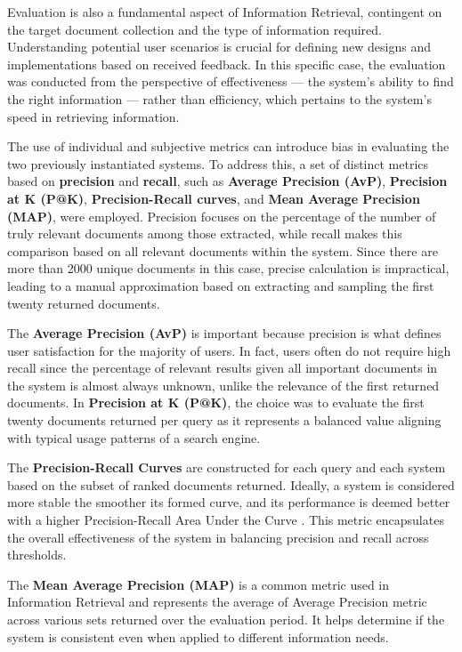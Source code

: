 \documentclass[sigconf]{acmart}
\begin{document}
Evaluation is also a fundamental aspect of Information Retrieval, contingent on the target document collection and the type of information required. Understanding potential user scenarios is crucial for defining new designs and implementations based on received feedback. In this specific case, the evaluation was conducted from the perspective of effectiveness — the system's ability to find the right information — rather than efficiency, which pertains to the system's speed in retrieving information.

The use of individual and subjective metrics can introduce bias in evaluating the two previously instantiated systems. To address this, a set of distinct metrics based on \textbf{precision} and \textbf{recall}, such as \textbf{Average Precision (AvP)}, \textbf{Precision at K (P@K)}, \textbf{Precision-Recall curves}, and \textbf{Mean Average Precision (MAP)}, were employed. Precision focuses on the percentage of the number of truly relevant documents among those extracted, while recall makes this comparison based on all relevant documents within the system. Since there are more than 2000 unique documents in this case, precise calculation is impractical, leading to a manual approximation based on extracting and sampling the first twenty returned documents.

The \textbf{Average Precision (AvP)} is important because precision is what defines user satisfaction for the majority of users. In fact, users often do not require high recall since the percentage of relevant results given all important documents in the system is almost always unknown, unlike the relevance of the first returned documents. In \textbf{Precision at K (P@K)}, the choice was to evaluate the first twenty documents returned per query as it represents a balanced value aligning with typical usage patterns of a search engine.

The \textbf{Precision-Recall Curves} are constructed for each query and each system based on the subset of ranked documents returned. Ideally, a system is considered more stable the smoother its formed curve, and its performance is deemed better with a higher Precision-Recall Area Under the Curve \cite{Precision_Recall}. This metric encapsulates the overall effectiveness of the system in balancing precision and recall across thresholds.

The \textbf{Mean Average Precision (MAP)} is a common metric used in Information Retrieval and represents the average of Average Precision metric across various sets returned over the evaluation period. It helps determine if the system is consistent even when applied to different information needs.
\end{document}
